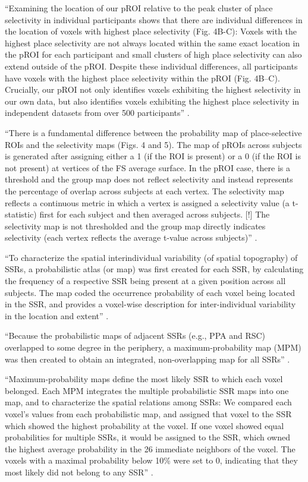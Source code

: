 ``Examining the location of our pROI relative to the peak cluster of place
selectivity in individual participants shows that there are individual
differences in the location of voxels with highest place selectivity (Fig.
4B-C):
%
Voxels with the highest place selectivity are not always located within the same
exact location in the pROI for each participant and small clusters of high place
selectivity can also extend outside of the pROI.
%
Despite these individual differences, all participants have voxels with the
highest place selectivity within the pROI (Fig. 4B–C).
%
Crucially, our pROI not only identifies voxels exhibiting the highest
selectivity in our own data, but also identifies voxels exhibiting the highest
place selectivity in independent datasets from over 500 participants''
\citep{weiner2018defining}.

``There is a fundamental difference between the probability map of
place-selective ROIs and the selectivity maps (Figs. 4 and 5).
%
The map of pROIs across subjects is generated after assigning either a 1 (if the
ROI is present) or a 0 (if the ROI is not present) at vertices of the FS average
surface.
%
In the pROI case, there is a threshold and the group map does not reflect
selectivity and instead represents the percentage of overlap across subjects at
each vertex.
%
The selectivity map reflects a continuous metric in which a vertex is assigned a
selectivity value (a t-statistic) first for each subject and then averaged
across subjects.
%
[!] The selectivity map is not thresholded and the group map directly indicates
selectivity (each vertex reflects the average t-value across subjects)''
\citep{weiner2018defining}.




``To characterize the spatial interindividual variability (of spatial
topography) of SSRs, a probabilistic atlas (or map) was first created for each
SSR, by calculating the frequency of a respective SSR being present at a given
position across all subjects.
%
The map coded the occurrence probability of each voxel being located in the SSR,
and provides a voxel-wise description for inter-individual variability in the
location and extent'' \citep{zhen2017quantifying}.

``Because the probabilistic maps of adjacent SSRs (e.g., PPA and RSC) overlapped
to some degree in the periphery, a maximum-probability map (MPM) was then
created to obtain an integrated, non-overlapping map for all SSRs''
\citep{zhen2017quantifying}.


``Maximum-probability maps define the most likely SSR to which each voxel
belonged.
%
Each MPM integrates the multiple probabilistic SSR maps into one map, and to
characterize the spatial relations among SSRs:
%
We compared each voxel's values from each probabilistic map, and assigned that
voxel to the SSR which showed the highest probability at the voxel.
%
If one voxel showed equal probabilities for multiple SSRs, it would be assigned
to the SSR, which owned the highest average probability in the 26 immediate
neighbors of the voxel.
%
The voxels with a maximal probability below 10\% were set to 0, indicating that
they most likely did not belong to any SSR'' \citep{zhen2017quantifying}.


